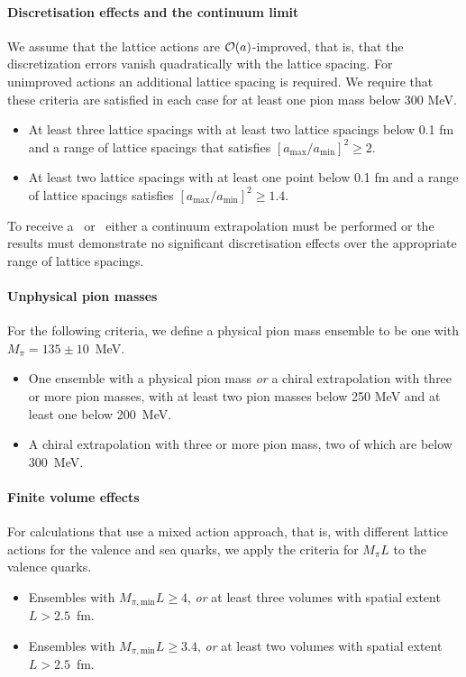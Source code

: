 \paragraph{Discretisation effects and the continuum limit} We assume that the lattice actions are
${\cal O}(a)$-improved, that is, that the discretization errors vanish quadratically with the lattice spacing. 
For unimproved actions an additional lattice spacing is required. We require that these
criteria are satisfied in each case for at least one pion mass below 300 MeV.
\begin{itemize}
\item[\bstar] At least three lattice spacings with at least two lattice spacings below 0.1 fm and
a range of lattice spacings that satisfies $[a_{\mathrm{max}}/a_{\mathrm{min}}]^2 \geq 2$.
\item[\bcirc] At least two lattice spacings with at least one point below 0.1 fm and a range of lattice spacings 
satisfies $[a_{\mathrm{max}}/a_{\mathrm{min}}]^2 \geq 1.4$.
\end{itemize}
To receive a \bstar~or \bcirc~either a continuum extrapolation must be performed or the results must
demonstrate no significant discretisation effects over the appropriate range of lattice spacings.

\paragraph{Unphysical pion masses} For the following criteria, we define a physical pion mass ensemble 
to be one with $M_\pi=135\pm 10$~MeV.
\begin{itemize}
\item[\bstar] One ensemble with a physical pion mass \emph{or} a chiral extrapolation with three or more pion masses,
with at least two pion masses below 250 MeV and at least one below 200~MeV.
\item[\bcirc] A chiral extrapolation with three or more pion mass, two of which are below 300~MeV.
\end{itemize}

\paragraph{Finite volume effects} For calculations that use a mixed action approach, that is,
with different lattice actions for the valence and sea quarks, we apply the criteria for $M_\pi L$ to the valence quarks.
\begin{itemize}
\item[\bstar] Ensembles with $M_{\pi,\mathrm{min}}L\geq 4$, \emph{or} at least three volumes with spatial extent
$L>2.5$~fm.
\item[\bcirc] Ensembles with $M_{\pi,\mathrm{min}}L \geq 3.4$, \emph{or} at least two volumes with spatial extent
$L>2.5$~fm.
\end{itemize}

